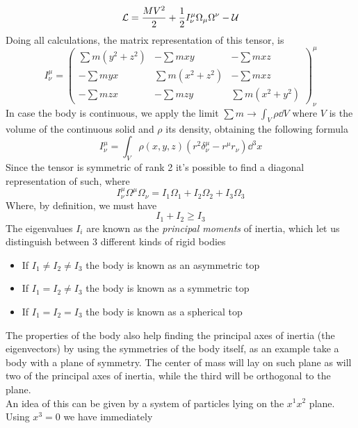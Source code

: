 \documentclass[../admech.tex]{subfiles}
\begin{document}
\begin{equation}
	\mathcal{L}=\frac{MV^2}{2}+\frac{1}{2}I^\mu_\nu\Omega_\mu\Omega^\nu-\mathcal{U}
	\label{eq:rigidlag}
\end{equation}
Doing all calculations, the matrix representation of this tensor, is
\begin{equation}
	I^\mu_\nu=\begin{pmatrix}\sum m(y^2+z^2)&-\sum mxy&-\sum mxz\\-\sum myx&\sum m(x^2+z^2)&-\sum mxz\\-\sum mzx&-\sum mzy&\sum m(x^2+y^2)\end{pmatrix}^\mu_\nu
	\label{eq:matrepinertia}
\end{equation}
In case the body is continuous, we apply the limit $\sum m\to\int_V\rho\dd V$ where $V$ is the volume of the continuous solid and $\rho$ its density, obtaining the following formula
\begin{equation}
	I^\mu_\nu=\int_{V}^{}\rho(x,y,z)\left( r^2\delta^\mu_\nu-r^\mu r_\nu \right)\dd^3x
	\label{eq:continertia}
\end{equation}
Since the tensor is symmetric of rank 2 it's possible to find a diagonal representation of such, where
\begin{equation}
	I^\mu_\nu\Omega^\mu\Omega_\nu=I_1\Omega_1+I_2\Omega_2+I_3\Omega_3
	\label{eq:diaginertia}
\end{equation}
Where, by definition, we must have
\begin{equation*}
	I_1+I_2\ge I_3
\end{equation*}
The eigenvalues $I_i$ are known as the \emph{principal moments} of inertia, which let us distinguish between 3 different kinds of rigid bodies
\begin{itemize}
\item If $I_1\ne I_2\ne I_3$ the body is known as an asymmetric top
\item If $I_1=I_2\ne I_3$ the body is known as a symmetric top
\item If $I_1=I_2=I_3$ the body is known as a spherical top
\end{itemize}
The properties of the body also help finding the principal axes of inertia (the eigenvectors) by using the symmetries of the body itself, as an example take a body with a plane of symmetry. The center of mass will lay on such plane as will two of the principal axes of inertia, while the third will be orthogonal to the plane.\\
An idea of this can be given by a system of particles lying on the $x^1x^2$ plane. Using $x^3=0$ we have immediately
\end{document}
